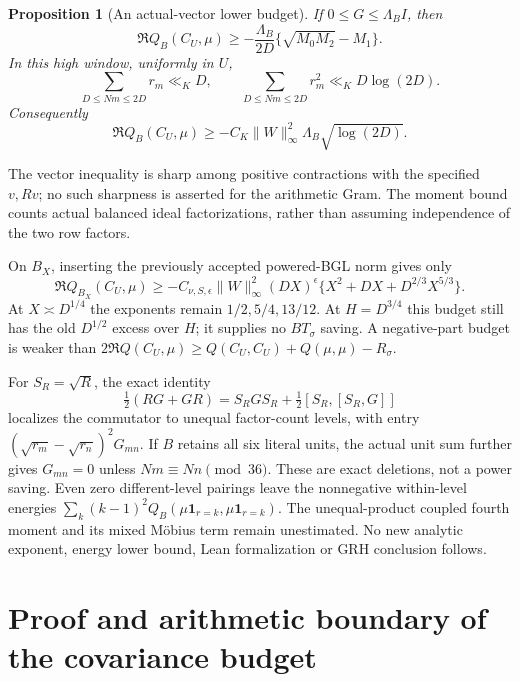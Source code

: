 \documentclass[11pt]{article}
\newtheorem{proposition}[theorem]{Proposition}
\theoremstyle{definition}\newtheorem{definition}[theorem]{Definition}
\theoremstyle{remark}\newtheorem{remark}[theorem]{Remark}
\begin{document}
\begin{proposition}[An actual-vector lower budget]\label{cbq:budget}
If $0\le G\le\Lambda_B I$, then
\begin{equation}\label{cbq:vector}
 \Re Q_B(C_U,\mu)\ge
 -\frac{\Lambda_B}{2D}\{\sqrt{M_0M_2}-M_1\}.
\end{equation}
In this high window, uniformly in $U$,
\begin{equation}\label{cbq:moments}
 \sum_{D\le Nm\le2D}r_m\ll_K D,\qquad
 \sum_{D\le Nm\le2D}r_m^2\ll_K D\log(2D).
\end{equation}
Consequently
\[
 \Re Q_B(C_U,\mu)\ge
 -C_K\|W\|_\infty^2\Lambda_B\sqrt{\log(2D)}.
\]
\end{proposition}
The vector inequality is sharp among positive contractions with the
specified $v,Rv$; no such sharpness is asserted for the arithmetic Gram.
The moment bound counts actual balanced ideal factorizations, rather than
assuming independence of the two row factors.

On $B_X$, inserting the previously accepted powered-BGL norm gives only
\[
 \Re Q_{B_X}(C_U,\mu)\ge
 -C_{\nu,S,\epsilon}\|W\|_\infty^2(DX)^\epsilon
 \{X^2+DX+D^{2/3}X^{5/3}\}.
\]
At $X\asymp D^{1/4}$ the exponents remain $1/2,5/4,13/12$.
At $H=D^{3/4}$ this budget still has the old $D^{1/2}$ excess over $H$;
it supplies no $BT_\sigma$ saving. A negative-part budget is weaker than
$2\Re Q(C_U,\mu)\ge Q(C_U,C_U)+Q(\mu,\mu)-R_\sigma$.

For $S_R=\sqrt R$, the exact identity
\[
 \tfrac12(RG+GR)=S_RGS_R+\tfrac12[S_R,[S_R,G]]
\]
localizes the commutator to unequal factor-count levels, with entry
$(\sqrt{r_m}-\sqrt{r_n})^2G_{mn}$. If $B$ retains all six literal units,
the actual unit sum further gives $G_{mn}=0$ unless $Nm\equiv Nn\pmod{36}$.
These are exact deletions, not a power saving. Even zero different-level
pairings leave the nonnegative within-level energies
$\sum_k(k-1)^2Q_B(\mu\mathbf1_{r=k},\mu\mathbf1_{r=k})$.
The unequal-product coupled fourth moment and its mixed M\"obius term
remain unestimated. No new analytic exponent, energy lower bound,
Lean formalization or GRH conclusion follows.

\section{Proof and arithmetic boundary of the covariance budget}\label{cbq:details}
\end{document}
